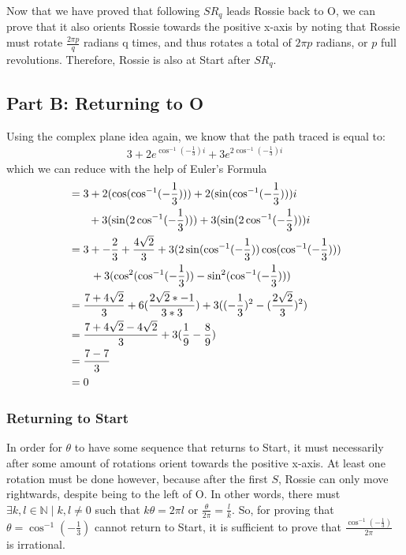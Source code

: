 \documentclass{article}
\begin{document}
  Now that we have proved that following $SR_q$ leads Rossie back to O, we can prove that it also orients Rossie towards the positive x-axis by noting that Rossie must rotate $\frac{2\pi p}{q}$ radians q times, and thus rotates a total of $2\pi p$ radians, or $p$ full revolutions. Therefore, Rossie is also at Start after $SR_q$.
  \subsection{Part B: Returning to O}
    Using the complex plane idea again, we know that the path traced is equal to:
  \begin{align}
    3 + 2e^{\cos^{-1}(-\frac{1}{3})i} + 3e^{2\cos^{-1}(-\frac{1}{3}) i}
  \end{align}
  which we can reduce with the help of Euler's Formula
  \begin{align}
    &= 3 + 2(\cos(\cos^{-1}(-\frac{1}{3}))) + 2(\sin(\cos^{-1}(-\frac{1}{3})))i \\  
    &\hspace{18px} + 3(\sin(2\cos^{-1}(-\frac{1}{3}))) + 3(\sin(2\cos^{-1}(-\frac{1}{3})))i \\
    &= 3 + -\frac{2}{3} + \frac{4\sqrt2}{3} + 3(2\sin(\cos^{-1}(-\frac{1}{3}))\cos(\cos^{-1}(-\frac{1}{3})))\\
    &\hspace{20px} + 3(\cos^2(\cos^{-1}(-\frac{1}{3})) - \sin^2(\cos^{-1}(-\frac{1}{3})))\\
    &= \frac{7 + 4\sqrt2}{3} + 6(\frac{2\sqrt2 * -1}{3*3}) + 3((-\frac{1}{3})^2 - (\frac{2\sqrt2}{3})^2)\\
    &= \frac{7 + 4\sqrt2 - 4\sqrt2}{3} + 3(\frac{1}{9} - \frac{8}{9})\\
    &= \frac{7 - 7}{3} \\
    &= 0
  \end{align}
  \subsubsection{Returning to Start}
  In order for $\theta$ to have some sequence that returns to Start, it must necessarily after some amount of rotations orient towards the positive x-axis. At least one rotation must be done however, because after the first $S$, Rossie can only move rightwards, despite being to the left of O. In other words, there must $\exists k, l \in \mathbb{N} \mid k, l \neq 0$ such that $k\theta = 2\pi l$ or $\frac{\theta}{2\pi} = \frac{l}{k}$. So, for proving that $\theta = \cos^{-1}(-\frac{1}{3})$ cannot return to Start, it is sufficient to prove that $\frac{\cos^{-1}(-\frac{1}{3})}{2\pi}$ is irrational.
\end{document}
